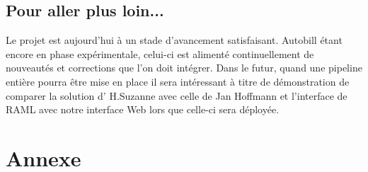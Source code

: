 \documentclass[12pt]{article}
\begin{document}
\subsection{Pour aller plus loin...}\label{Pour aller plus loin...}
Le projet est aujourd'hui à un stade d'avancement satisfaisant. Autobill étant
encore en phase expérimentale, celui-ci est alimenté continuellement de
nouveautés et corrections que l'on doit intégrer. 
Dans le futur, quand une pipeline entière pourra être mise en place il sera intéressant à titre de démonstration de comparer la solution d' H.Suzanne avec celle de Jan Hoffmann et l'interface de RAML
\cite{RAML} avec notre interface Web lors que celle-ci sera déployée.

\newpage

{}

\newpage

\section*{Annexe}\label{annexe}
%

\newenvironment{Shaded}{}{}
\newcommand{\AlertTok}[1]{\textcolor[rgb]{1.00,0.00,0.00}{\textbf{#1}}}
\newcommand{\AnnotationTok}[1]{\textcolor[rgb]{0.38,0.63,0.69}{\textbf{\textit{#1}}}}
\newcommand{\AttributeTok}[1]{\textcolor[rgb]{0.49,0.56,0.16}{#1}}
\newcommand{\BaseNTok}[1]{\textcolor[rgb]{0.25,0.63,0.44}{#1}}
\newcommand{\BuiltInTok}[1]{\textcolor[rgb]{0.00,0.50,0.00}{#1}}
\newcommand{\CharTok}[1]{\textcolor[rgb]{0.25,0.44,0.63}{#1}}
\newcommand{\CommentTok}[1]{\textcolor[rgb]{0.38,0.63,0.69}{\textit{#1}}}
\newcommand{\CommentVarTok}[1]{\textcolor[rgb]{0.38,0.63,0.69}{\textbf{\textit{#1}}}}
\newcommand{\ConstantTok}[1]{\textcolor[rgb]{0.53,0.00,0.00}{#1}}
\newcommand{\ControlFlowTok}[1]{\textcolor[rgb]{0.00,0.44,0.13}{\textbf{#1}}}
\newcommand{\DataTypeTok}[1]{\textcolor[rgb]{0.56,0.13,0.00}{#1}}
\newcommand{\DecValTok}[1]{\textcolor[rgb]{0.25,0.63,0.44}{#1}}
\newcommand{\DocumentationTok}[1]{\textcolor[rgb]{0.73,0.13,0.13}{\textit{#1}}}
\newcommand{\ErrorTok}[1]{\textcolor[rgb]{1.00,0.00,0.00}{\textbf{#1}}}
\newcommand{\ExtensionTok}[1]{#1}
\newcommand{\FloatTok}[1]{\textcolor[rgb]{0.25,0.63,0.44}{#1}}
\newcommand{\FunctionTok}[1]{\textcolor[rgb]{0.02,0.16,0.49}{#1}}
\newcommand{\ImportTok}[1]{\textcolor[rgb]{0.00,0.50,0.00}{\textbf{#1}}}
\newcommand{\InformationTok}[1]{\textcolor[rgb]{0.38,0.63,0.69}{\textbf{\textit{#1}}}}
\newcommand{\KeywordTok}[1]{\textcolor[rgb]{0.00,0.44,0.13}{\textbf{#1}}}
\newcommand{\NormalTok}[1]{#1}
\newcommand{\OperatorTok}[1]{\textcolor[rgb]{0.40,0.40,0.40}{#1}}
\newcommand{\OtherTok}[1]{\textcolor[rgb]{0.00,0.44,0.13}{#1}}
\newcommand{\PreprocessorTok}[1]{\textcolor[rgb]{0.74,0.48,0.00}{#1}}
\newcommand{\RegionMarkerTok}[1]{#1}
\newcommand{\SpecialCharTok}[1]{\textcolor[rgb]{0.25,0.44,0.63}{#1}}
\newcommand{\SpecialStringTok}[1]{\textcolor[rgb]{0.73,0.40,0.53}{#1}}
\newcommand{\StringTok}[1]{\textcolor[rgb]{0.25,0.44,0.63}{#1}}
\newcommand{\VariableTok}[1]{\textcolor[rgb]{0.10,0.09,0.49}{#1}}
\newcommand{\VerbatimStringTok}[1]{\textcolor[rgb]{0.25,0.44,0.63}{#1}}
\newcommand{\WarningTok}[1]{\textcolor[rgb]{0.38,0.63,0.69}{\textbf{\textit{#1}}}}
\end{document}
